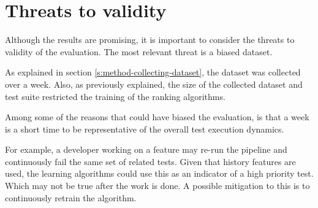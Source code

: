 \section{Threats to validity}\label{s:conclusion-threats}

Although the results are promising, it is important to consider
the threats to validity of the evaluation. The most relevant threat 
is a biased dataset.

As explained in section \ref{s:method-collecting-dataset}, the dataset was 
collected over a week. Also, as previously explained, the size of 
the collected dataset and test suite restricted the training of the ranking
algorithms.

Among some of the reasons that could have biased the evaluation, is that
a week is a short time to be representative of the overall test execution dynamics.

For example, a developer working on a feature may re-run the pipeline and continuously
fail the same set of related tests. Given that history features are used, the learning algorithms
could use this as an indicator of a high priority test. Which may not be true after the 
work is done. A possible mitigation to this is to continuously retrain the algorithm.

